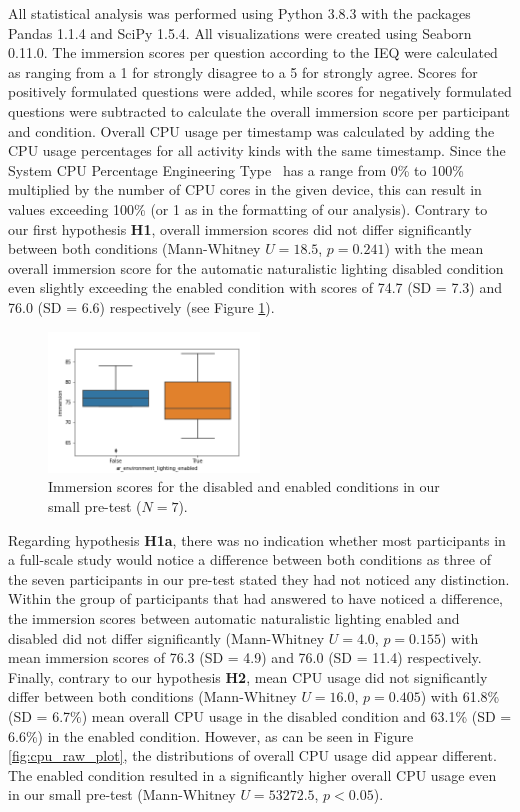 \documentclass[12pt,twoside,english]{article}
\begin{document}
All statistical analysis was performed using Python 3.8.3 with the packages Pandas 1.1.4 and SciPy 1.5.4.
All visualizations were created using Seaborn 0.11.0.
The immersion scores per question according to the \gls{IEQ} were calculated as ranging from a 1 for strongly disagree to a 5 for strongly agree.
Scores for positively formulated questions were added, while scores for negatively formulated questions were subtracted to calculate the overall immersion score per participant and condition.
Overall \gls{CPU} usage per timestamp was calculated by adding the \gls{CPU} usage percentages for all activity kinds with the same timestamp.
Since the System CPU Percentage Engineering Type~\cite{apple_system_2020} has a range from 0\% to 100\% multiplied by the number of \gls{CPU} cores in the given device, this can result in values exceeding 100\% (or 1 as in the formatting of our analysis).
Contrary to our first hypothesis \textbf{H1}, overall immersion scores did not differ significantly between both conditions (Mann-Whitney $ U = 18.5 $, $ p = 0.241 $) with the mean overall immersion score for the automatic naturalistic lighting disabled condition even slightly exceeding the enabled condition with scores of 74.7 (SD = 7.3) and 76.0 (SD = 6.6) respectively (see Figure \ref{fig:immersion_plot}).

\begin{figure}[h]
    \centering
    \includegraphics[width=0.5\textwidth]{imgs/immersion_plot}
    \caption{Immersion scores for the disabled and enabled conditions in our small pre-test ($ N = 7 $).}
    \label{fig:immersion_plot}
\end{figure}

Regarding hypothesis \textbf{H1a}, there was no indication whether most participants in a full-scale study would notice a difference between both conditions as three of the seven participants in our pre-test stated they had not noticed any distinction.
Within the group of participants that had answered to have noticed a difference, the immersion scores between automatic naturalistic lighting enabled and disabled did not differ significantly (Mann-Whitney $ U = 4.0 $, $ p = 0.155 $) with mean immersion scores of 76.3 (SD = 4.9) and 76.0 (SD = 11.4) respectively.
Finally, contrary to our hypothesis \textbf{H2}, mean \gls{CPU} usage did not significantly differ between both conditions (Mann-Whitney $ U = 16.0 $, $ p = 0.405 $) with 61.8\% (SD = 6.7\%) mean overall \gls{CPU} usage in the disabled condition and 63.1\% (SD = 6.6\%) in the enabled condition.
However, as can be seen in Figure \ref{fig:cpu_raw_plot}, the distributions of overall \gls{CPU} usage did appear different.
The enabled condition resulted in a significantly higher overall \gls{CPU} usage even in our small pre-test (Mann-Whitney $ U = 53272.5 $, $ p < 0.05 $).
\end{document}
